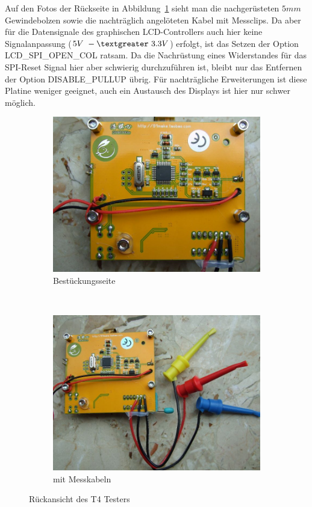Auf den Fotos der Rückseite in Abbildung~\ref{fig:T4_back} sieht man die nachgerüsteten
\(5mm\) Gewindebolzen sowie die nachträglich angelöteten Kabel mit Messclips.
Da aber für die Datensignale des graphischen LCD-Controllers auch hier
keine Signalanpassung (\(5V~-\textgreater ~3.3V\)) erfolgt, ist das Setzen der Option LCD\_SPI\_OPEN\_COL ratsam.
Da die Nachrüstung eines  Widerstandes für das SPI-Reset Signal hier
aber schwierig durchzuführen ist, bleibt nur das Entfernen der Option
DISABLE\_PULLUP übrig. 
Für nachträgliche Erweiterungen ist diese Platine weniger geeignet, auch ein Austausch des
Displays ist hier nur schwer möglich.

\begin{figure}[H]
  \begin{subfigure}[b]{.5\textwidth}	%
    \centering
    \includegraphics[width=1.\textwidth]{../PNG/T4_back.JPG}	%
    \caption{Bestückungsseite}
  \end{subfigure}
~
  \begin{subfigure}[b]{.5\textwidth}	%
    \centering
    \includegraphics[width=1.\textwidth]{../PNG/T4_back_clips.JPG}	%
    \caption{mit Messkabeln}
  \end{subfigure}
  \caption{Rückansicht des T4 Testers}
\label{fig:T4_back}
\end{figure}

